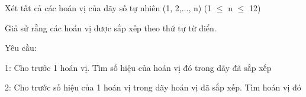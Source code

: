 Xét tất cả các hoán vị của dãy số tự nhiên (1, 2,..., n) (1  $\le$  n  $\le$  12)  

   Giả sử rằng các hoán vị được sắp xếp theo thứ tự từ điển.  

   Yêu cầu:  

   1: Cho trước 1 hoán vị. Tìm số hiệu của hoán vị đó trong dãy đã sắp xếp  

   2: Cho trước số hiệu của 1 hoán vị trong dãy hoán vị đã sắp xếp. Tìm hoán vị đó